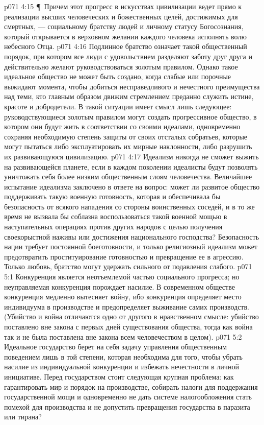 \vs p071 4:15 \P\ Причем этот прогресс в искусствах цивилизации ведет прямо к реализации высших человеческих и божественных целей, достижимых для смертных, --- социальному братству людей и личному статусу Богосознания, который открывается в верховном желании каждого человека исполнять волю небесного Отца.
\vs p071 4:16 Подлинное братство означает такой общественный порядок, при котором все люди с удовольствием разделяют заботу друг друга и действительно желают руководствоваться золотым правилом. Однако такое идеальное общество не может быть создано, когда слабые или порочные выжидают момента, чтобы добиться несправедливого и нечестного преимущества над теми, кто главным образом движим стремлением преданно служить истине, красоте и добродетели. В такой ситуации имеет смысл лишь следующее: руководствующиеся золотым правилом могут создать прогрессивное общество, в котором они будут жить в соответствии со своими идеалами, одновременно сохраняя необходимую степень защиты от своих отсталых собратьев, которые могут пытаться либо эксплуатировать их мирные наклонности, либо разрушить их развивающуюся цивилизацию.
\vs p071 4:17 Идеализм никогда не сможет выжить на развивающейся планете, если в каждом поколении идеалисты будут позволять уничтожать себя более низким общественным слоям человечества. Величайшее испытание идеализма заключено в ответе на вопрос: может ли развитое общество поддерживать такую военную готовность, которая и обеспечивала бы безопасность от всякого нападения со стороны воинственных соседей, и в то же время не вызвала бы соблазна воспользоваться такой военной мощью в наступательных операциях против других народов с целью получения своекорыстной наживы или достижения национального господства? Безопасность нации требует постоянной боеготовности, и только религиозный идеализм может предотвратить проституирование готовностью и превращение ее в агрессию. Только любовь, братство могут удержать сильного от подавления слабого.
\vs p071 5:1 Конкуренция является неотъемлемой частью социального прогресса; но неуправляемая конкуренция порождает насилие. В современном обществе конкуренция медленно вытесняет войну, ибо конкуренция определяет место индивидуума в производстве и предопределяет выживание самих производств. (Убийство и война отличаются одно от другого в нравственном смысле: убийство поставлено вне закона с первых дней существования общества, тогда как война так и не была поставлена вне закона всем человечеством в целом).
\vs p071 5:2 Идеальное государство берет на себя задачу управления общественным поведением лишь в той степени, которая необходима для того, чтобы убрать насилие из индивидуальной конкуренции и избежать нечестности в личной инициативе. Перед государством стоит следующая крупная проблема: как гарантировать мир и порядок на производстве, собирать налоги для поддержания государственной мощи и одновременно не дать системе налогообложения стать помехой для производства и не допустить превращения государства в паразита или тирана?
